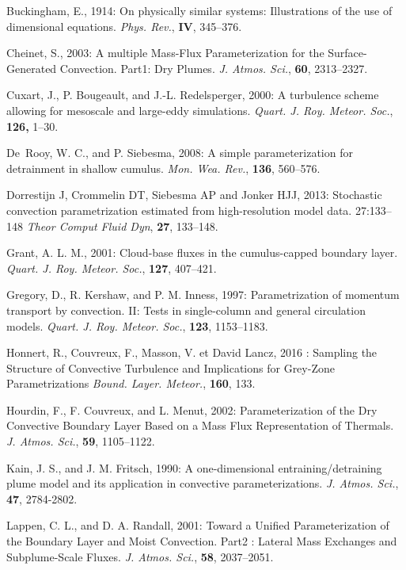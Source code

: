 \noindent \por
Buckingham, E., 1914: On physically similar systems: Illustrations of the use of
  dimensional equations.
{\it Phys. Rev.}, {\bf IV}, 345--376.

\noindent \por
Cheinet, S., 2003: A multiple Mass-Flux Parameterization for the
  Surface-Generated Convection. Part1: Dry Plumes.
{\it J. Atmos. Sci.}, {\bf 60}, 2313--2327.

\noindent \por
Cuxart, J., P. Bougeault, and J.-L. Redelsperger, 2000:
A turbulence scheme allowing for mesoscale and large-eddy simulations.
{\it Quart. J. Roy. Meteor. Soc.}, {\bf 126,} 1--30.

\noindent \por
De~Rooy, W. C., and P. Siebesma, 2008:
 A simple parameterization for detrainment in shallow cumulus.
{\it Mon. Wea. Rev.}, {\bf 136}, 560--576.

\noindent \por
Dorrestijn J, Crommelin DT, Siebesma AP and Jonker HJJ, 2013:
Stochastic convection parametrization estimated from high-resolution model data.  27:133--148
{\it Theor Comput Fluid Dyn}, {\bf 27}, 133--148.

\noindent \por
Grant, A. L. M., 2001: Cloud-base fluxes in the cumulus-capped boundary layer.
{\it Quart. J. Roy. Meteor. Soc.}, {\bf 127}, 407--421.

\noindent \por
Gregory, D., R. Kershaw, and P. M. Inness, 1997:
 Parametrization of momentum transport by
  convection. II: Tests in single-column and general circulation models.
{\it Quart. J. Roy. Meteor. Soc.}, {\bf 123}, 1153--1183.

\noindent \por
Honnert, R., Couvreux, F., Masson, V. et David Lancz, 2016 :
Sampling the Structure of Convective Turbulence and Implications for Grey-Zone Parametrizations
{\it Bound. Layer. Meteor.}, {\bf 160}, 133.

\noindent \por
Hourdin, F., F. Couvreux, and L. Menut, 2002:
 Parameterization of the Dry Convective
  Boundary Layer Based on a Mass Flux Representation of Thermals.
{\it J. Atmos. Sci.}, {\bf 59}, 1105--1122.

\noindent \por
Kain, J. S., and J. M. Fritsch, 1990: A one-dimensional
entraining/detraining plume model and its application in
convective parameterizations. {\it J. Atmos. Sci.},
{\bf 47}, 2784-2802.

\noindent \por
Lappen, C. L., and D. A. Randall, 2001:
Toward a Unified Parameterization of the Boundary Layer and Moist Convection. 
Part2 : Lateral Mass Exchanges and Subplume-Scale Fluxes.
{\it J. Atmos. Sci.}, {\bf 58}, 2037--2051.


